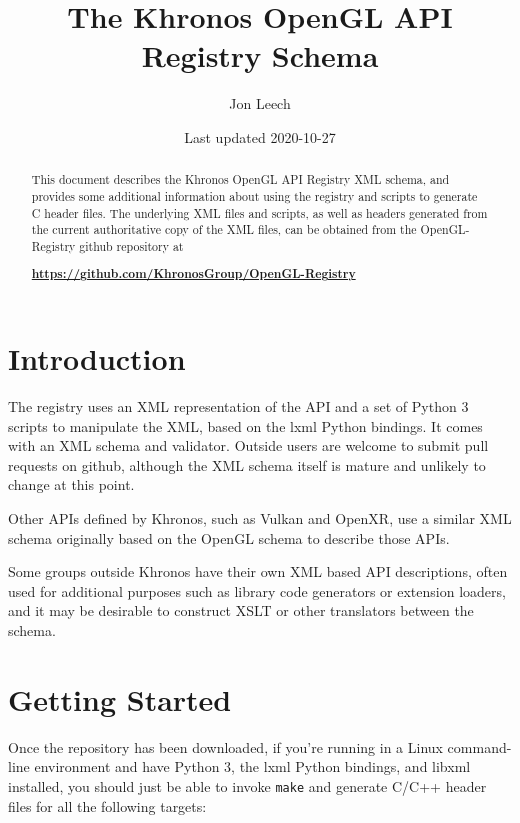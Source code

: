\documentclass{article}
\def\code#1{{\tt #1}}
\begin{document}
\title{The Khronos OpenGL API Registry Schema}
\author{Jon Leech}
\date{Last updated 2020-10-27}
\maketitle

\begin{abstract}

This document describes the Khronos OpenGL API Registry XML schema, and provides
some additional information about using the registry and scripts to generate
C header files. The underlying XML files and scripts, as well as headers
generated from the current authoritative copy of the XML files, can be
obtained from the OpenGL-Registry github repository at

\begin{center}
{\bf \href{https://github.com/KhronosGroup/OpenGL-Registry}
          {https://github.com/KhronosGroup/OpenGL-Registry}}
\end{center}

\end{abstract}

\tableofcontents

\section{Introduction}

The registry uses an XML representation of the API and a set of Python 3
scripts to manipulate the XML, based on the lxml Python bindings. It comes
with an XML schema and validator. Outside users are welcome to submit pull
requests on github, although the XML schema itself is mature and unlikely to
change at this point.

Other APIs defined by Khronos, such as Vulkan and OpenXR, use a similar XML
schema originally based on the OpenGL schema to describe those APIs.

Some groups outside Khronos have their own XML based API descriptions,
often used for additional purposes such as library code generators or
extension loaders, and it may be desirable to construct XSLT or other
translators between the schema.


\section{Getting Started}

Once the repository has been downloaded, if you're running
in a Linux command-line environment and have Python 3, the lxml Python
bindings, and libxml installed, you should just be able to invoke
\code{make} and generate C/C++ header files for all the following
targets:
\end{document}
